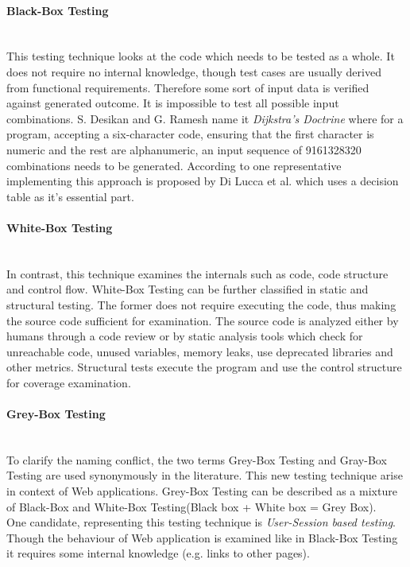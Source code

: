 \documentclass[12pt, notitlepage]{article}
\begin{document}
\paragraph{Black-Box Testing} ~\\
This testing technique looks at the code which needs to be tested as a whole. It does not require no internal knowledge, though test cases are usually 
derived from functional requirements. Therefore some sort of input data is verified against generated outcome.
It is impossible to test all possible input combinations. S. Desikan and G. Ramesh\cite{softare-testing-principles} name it \textit{Dijkstra's Doctrine}
where for a program, accepting a six-character code, ensuring that the first character is numeric and the rest are alphanumeric, an input 
sequence of 9161328320 combinations needs to be generated.
According to \cite{testing-overview} one representative implementing this approach is proposed by Di Lucca et al.\cite{decision-table-testing} which uses a decision table as it's essential part.  
\paragraph{White-Box Testing} ~\\
In contrast, this technique examines the internals such as code, code structure and control flow. White-Box Testing can be further classified in
static and structural testing. The former does not require executing the code, thus making the source code sufficient for examination. The source code
is analyzed either by humans through a code review or by static analysis tools which check for unreachable code, unused variables, memory leaks, use
deprecated libraries and other metrics. Structural tests execute the program and use the control structure for coverage examination\cite{structural-testing}.
\paragraph{Grey-Box Testing} ~\\
To clarify the naming conflict, the two terms Grey-Box Testing and Gray-Box Testing are used synonymously in the literature\cite{bridge-grey}. 
This new testing technique\cite{web-engineering} arise in context of Web applications. Grey-Box Testing can be described as a mixture of Black-Box and White-Box Testing(Black box + White box = Grey Box).\\
One candidate, representing this testing technique is \textit{User-Session based testing}. Though the behaviour of Web application is examined like in
Black-Box Testing it requires some internal knowledge (e.g. links to other pages).
\end{document}
